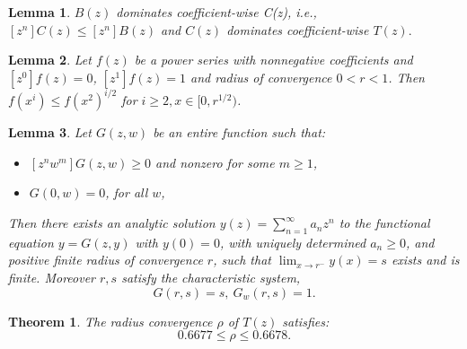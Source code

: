 \documentclass[10pt,a4paper]{amsart}
\newtheorem{lemma}{Lemma}
\newtheorem{theorem}{Theorem}
\begin{document}
\begin{lemma}\label{lem:planeTreeCoeffIneq} $B(z)$ dominates coefficient-wise C(z), i.e.,
 $[z^n] C(z) \leq [z^n] B(z)$ and $C(z)$ dominates coefficient-wise $T(z).$
\end{lemma}

\begin{lemma}\label{lemma:powerbounds}
Let $f(z)$ be a power series with nonnegative coefficients and
$[z^0] f(z) = 0$, $[z^1] f(z) = 1$ and radius of convergence $0 < r < 1$. 
Then $f(x^i) \leq f(x^2)^{i/2}$ for $i \geq 2, x \in [0,r^{1/2})$.
\end{lemma}

\begin{lemma}\label{lemma:implicitsing}
Let $G(z,w)$ be an entire  function such that:
\begin{itemize}
    \item $[z^nw^m]G(z,w) \geq 0$ and nonzero for some $m\geq 1$,
    \item $G(0,w) = 0$, for all $w$,
 \end{itemize}
  Then there exists an analytic solution $y(z) = \sum_{n=1}^{\infty}a_nz^n$ to the functional
equation $y=G(z,y)$ with $y(0)=0$, with uniquely determined $a_n \geq 0$,   and  positive finite radius of convergence $r$, such that   $\lim_{x \rightarrow r^{-}} y(x) = s$ exists and is finite.  Moreover $r,s$ satisfy the {\em characteristic} system,
\begin{equation*}
    G(r,s) = s,  \ 
    G_w(r,s) = 1.
\end{equation*}
\end{lemma}

\begin{theorem}\label{thm:boundstoradius}
The radius convergence $\rho$ of  $T(z)$ satisfies: 
\begin{equation*}
    0.6677 \leq \rho \leq 0.6678.
\end{equation*}
\end{theorem}
\end{document}
